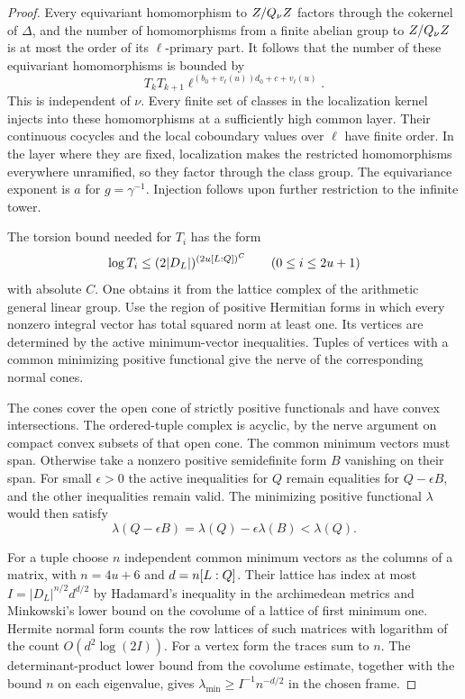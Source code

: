 \begin{proof}
Every equivariant
homomorphism to \(Z/Q_\nu Z\) factors through the
cokernel of \(\Delta\), and the number of homomorphisms
from a finite abelian group to \(Z/Q_\nu Z\) is at
most the order of its \(\ell\)-primary part. It follows that
the number of these equivariant homomorphisms is bounded by
\[
                    T_kT_{k+1}
                     \ell^{(b_0+v_\ell(u))d_0+c+v_\ell(u)}.
\]
This is independent of \(\nu\). Every finite set of
classes in the localization kernel injects into these
homomorphisms at a sufficiently high common layer.
Their continuous cocycles and the local coboundary
values over \(\ell\) have finite order. In the layer
where they are fixed, localization makes the restricted
homomorphisms everywhere unramified, so they factor
through the class group. The equivariance exponent is
\(a\) for \(g=\gamma^{-1}\). Injection follows upon further
restriction to the infinite tower.
\label{cor:cohomology-height-2}


The torsion bound needed for \(T_i\) has the form
\[
                        \log T_i\le
                  (2|D_L|)^{(2u[L:Q])^C}
                  \qquad(0\le i\le 2u+1)
\]
with absolute \(C\). One obtains it from the lattice
complex of the arithmetic general linear group. Use the
region of positive Hermitian forms in which every nonzero
integral vector has total squared norm at least one.
Its vertices are determined by the active minimum-vector
inequalities. Tuples of vertices with a common minimizing
positive functional give the nerve of the corresponding
normal cones.

The cones cover the open cone of strictly
positive functionals and have convex intersections.
The ordered-tuple complex is acyclic, by the nerve
argument on compact convex subsets of that open cone.
The common minimum vectors must span. Otherwise take a
nonzero positive semidefinite form \(B\) vanishing on their span.
For small \(\epsilon>0\) the active inequalities for \(Q\) remain
equalities for \(Q-\epsilon B\), and the other inequalities remain
valid. The minimizing positive functional \(\lambda\) would then satisfy
\[
           \lambda(Q-\epsilon B)=\lambda(Q)-\epsilon\lambda(B)<\lambda(Q).
\]

For a tuple choose \(n\) independent common minimum
vectors as the columns of a matrix, with \(n=4u+6\) and
\(d=n[L:Q]\). Their lattice has index at most
\(I=|D_L|^{n/2}d^{d/2}\) by Hadamard's inequality in the
archimedean metrics and Minkowski's lower bound on
the covolume of a lattice of first minimum one.
Hermite normal form counts the row lattices of such
matrices with logarithm of the count \(O(d^2\log(2I))\).
For a vertex form the traces sum to \(n\). The
determinant-product lower bound from the covolume estimate,
together with the bound \(n\) on each eigenvalue, gives
\(\lambda_{\min}\ge I^{-1}n^{-d/2}\) in the chosen frame.


\end{proof}
